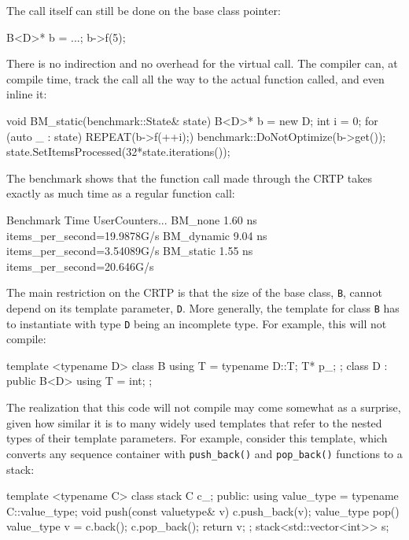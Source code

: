 The call itself can still be done on the base class pointer:

\begin{code}
B<D>* b = ...;
b->f(5);
\end{code}

There is no indirection and no overhead for the virtual call. The compiler can, at compile time, track the call all the way to the actual function called, and even inline it:

\begin{code}
void BM_static(benchmark::State& state) {
  B<D>* b = new D;
  int i = 0;
  for (auto _ : state) {
    REPEAT(b->f(++i);)
  }
  benchmark::DoNotOptimize(b->get());
  state.SetItemsProcessed(32*state.iterations());
}
\end{code}

The benchmark shows that the function call made through the CRTP takes exactly as much time as a regular function call:

\begin{code}
Benchmark           Time UserCounters...
BM_none          1.60 ns items_per_second=19.9878G/s
BM_dynamic       9.04 ns items_per_second=3.54089G/s
BM_static        1.55 ns items_per_second=20.646G/s
\end{code}

The main restriction on the CRTP is that the size of the base class, \texttt{B}, cannot depend on its template parameter, \texttt{D}. More generally, the template for class \texttt{B} has to instantiate with type \texttt{D} being an incomplete type. For example, this will not compile:

\begin{code}
template <typename D> class B {
  using T = typename D::T;
  T* p_;
};
class D : public B<D> {
  using T = int;
};
\end{code}

The realization that this code will not compile may come somewhat as a surprise, given how similar it is to many widely used templates that refer to the nested types of their template parameters. For example, consider this template, which converts any sequence container with \texttt{push\_back()} and \texttt{pop\_back()} functions to a stack:

\begin{code}
template <typename C> class stack {
  C c_;
  public:
  using value_type = typename C::value_type;
  void push(const valuetype& v) { c.push_back(v); }
  value_type pop() {
    value_type v = c.back();
    c.pop_back();
    return v;
  }
};
stack<std::vector<int>> s;
\end{code}

